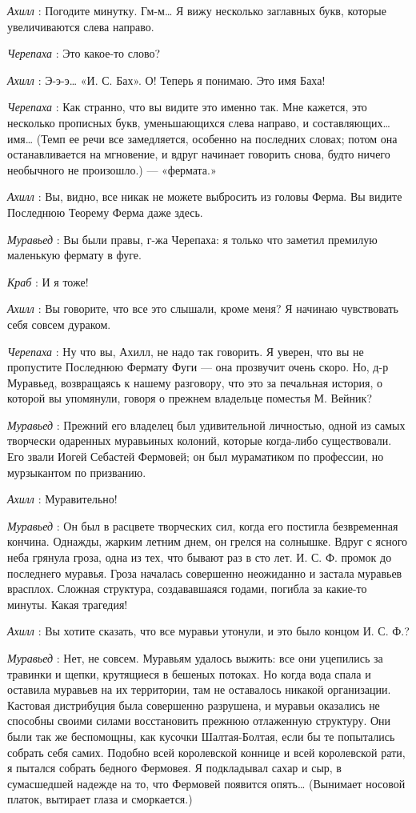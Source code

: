 \documentclass[../main.tex]{subfiles}
\begin{document}
\begin{dialogue}
\emph{Ахилл} : Погодите минутку. Гм-м\ldots{} Я вижу несколько заглавных букв, которые увеличиваются слева направо.

\emph{Черепаха} : Это какое-то слово?

\emph{Ахилл} : Э-э-э\ldots{} «И. С. Бах». О! Теперь я понимаю. Это имя Баха!

\emph{Черепаха} : Как странно, что вы видите это именно так. Мне кажется, это несколько прописных букв, уменьшающихся слева направо, и составляющих\ldots{} имя\ldots{} (Темп ее речи все замедляется, особенно на последних словах; потом она останавливается на мгновение, и вдруг начинает говорить снова, будто ничего необычного не произошло.) --- «фермата.»

\emph{Ахилл} : Вы, видно, все никак не можете выбросить из головы Ферма. Вы видите Последнюю Теорему Ферма даже здесь.

\emph{Муравьед} : Вы были правы, г-жа Черепаха: я только что заметил премилую маленькую фермату в фуге.

\emph{Краб} : И я тоже!

\emph{Ахилл} : Вы говорите, что все это слышали, кроме меня? Я начинаю чувствовать себя совсем дураком.

\emph{Черепаха} : Ну что вы, Ахилл, не надо так говорить. Я уверен, что вы не пропустите Последнюю Фермату Фуги --- она прозвучит очень скоро. Но, д-р Муравьед, возвращаясь к нашему разговору, что это за печальная история, о которой вы упомянули, говоря о прежнем владельце поместья М. Вейник?

\emph{Муравьед} : Прежний его владелец был удивительной личностью, одной из самых творчески одаренных муравьиных колоний, которые когда-либо существовали. Его звали Иогей Себастей Фермовей; он был мураматиком по профессии, но мурзыкантом по призванию.

\emph{Ахилл} : Муравительно!

\emph{Муравьед} : Он был в расцвете творческих сил, когда его постигла безвременная кончина. Однажды, жарким летним днем, он грелся на солнышке. Вдруг с ясного неба грянула гроза, одна из тех, что бывают раз в сто лет. И. С. Ф. промок до последнего муравья. Гроза началась совершенно неожиданно и застала муравьев врасплох. Сложная структура, создававшаяся годами, погибла за какие-то минуты. Какая трагедия!

\emph{Ахилл} : Вы хотите сказать, что все муравьи утонули, и это было концом И. С. Ф.?

\emph{Муравьед} : Нет, не совсем. Муравьям удалось выжить: все они уцепились за травинки и щепки, крутящиеся в бешеных потоках. Но когда вода спала и оставила муравьев на их территории, там не оставалось никакой организации. Кастовая дистрибуция была совершенно разрушена, и муравьи оказались не способны своими силами восстановить прежнюю отлаженную структуру. Они были так же беспомощны, как кусочки Шалтая-Болтая, если бы те попытались собрать себя самих. Подобно всей королевской коннице и всей королевской рати, я пытался собрать бедного Фермовея. Я подкладывал сахар и сыр, в сумасшедшей надежде на то, что Фермовей появится опять\ldots{} (Вынимает носовой платок, вытирает глаза и сморкается.)


\end{dialogue}
\end{document}
